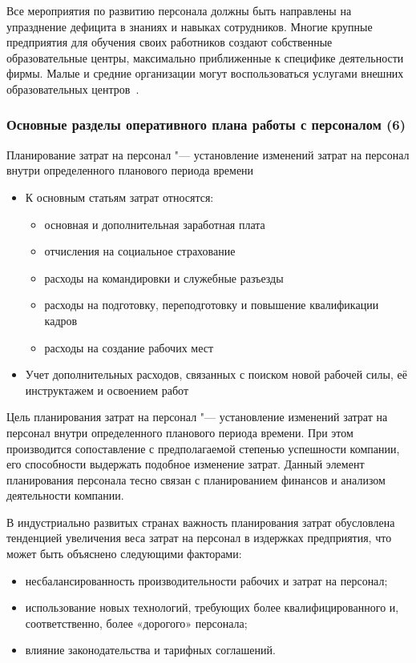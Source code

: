 \documentclass{../industrial-development}
\begin{document}
Все мероприятия по развитию персонала должны быть направлены на упразднение дефицита в знаниях и навыках сотрудников. Многие крупные предприятия для обучения своих работников создают собственные образовательные центры, максимально приближенные к специфике деятельности фирмы. Малые и средние организации могут воспользоваться услугами внешних образовательных центров~\cite{Durakova}.

\begin{frame} \frametitle{Основные разделы оперативного плана работы с персоналом (6)}
	\alert{Планирование затрат на персонал} "--- установление изменений затрат на персонал внутри определенного планового периода времени
	\begin{itemize}
		\item К основным статьям затрат относятся: 
		\begin{itemize}
			\item основная и дополнительная заработная плата
			\item отчисления на социальное страхование
			\item расходы на командировки и служебные разъезды
			\item расходы на подготовку, переподготовку и повышение квалификации кадров
			\item расходы на создание рабочих мест
		\end{itemize}
		\item Учет дополнительных расходов, связанных с поиском новой рабочей силы, её инструктажем и освоением работ
	\end{itemize}
\end{frame}

\lecturenotes

\alert{Цель планирования затрат на персонал} "--- установление изменений затрат на персонал внутри определенного планового периода времени. При этом производится сопоставление с предполагаемой степенью успешности компании, его способности выдержать подобное изменение затрат. Данный элемент планирования персонала тесно связан с планированием финансов и анализом деятельности компании.

В индустриально развитых странах важность планирования затрат обусловлена тенденцией увеличения веса затрат на персонал в издержках предприятия, что может быть объяснено следующими факторами:
\begin{itemize}
	\item несбалансированность производительности рабочих и затрат на персонал;
	\item использование новых технологий, требующих более квалифицированного и, соответственно, более «дорогого» персонала;
	\item влияние законодательства и тарифных соглашений.
\end{itemize}
\end{document}
